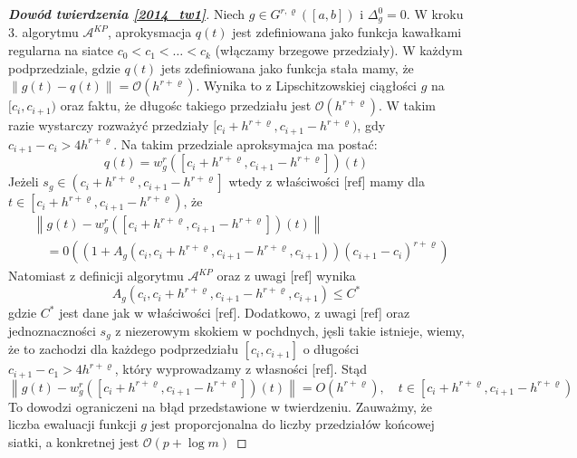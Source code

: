 \documentclass[oik, pdftex, robocza, man]{mgrwms}
\begin{document}
    \begin{proof}[\textbf{Dowód twierdzenia \eqref{2014_tw1}}]
        Niech $g \in G^{r, \varrho}([a,b])$ i $\Delta_{g}^{0} = 0$. W kroku 3. algorytmu $\mathcal{A}^{KP}$, aprokysmacja $q(t)$ jest zdefiniowana jako funkcja kawałkami regularna na siatce $c_{0} < c_{1} < \ldots < c_{k}$ (włączamy brzegowe przedziały). W każdym podprzedziale, gdzie $q(t)$ jets zdefiniowana jako funkcja stała mamy, że $\|g(t) - q(t)\| = \mathcal{O}(h^{r+\varrho})$. Wynika to z Lipschitzowskiej ciągłości $g$ na $[c_{i}, c_{i+1})$ oraz faktu, że długośc takiego przedziału jest $\mathcal{O}(h^{r+\varrho})$.
        W takim razie wystarczy rozważyć przedziały $[c_{i} + h^{r+\varrho}, c_{i+1} - h^{r+\varrho})$, gdy $c_{i+1}-c_{i} > 4h^{r+\varrho}$. Na takim przedziale aproksymajca ma postać:
        \begin{equation*}
            q(t)=w_{g}^{r}\left(\left[c_{i}+h^{r+\varrho}, c_{i+1}-h^{r+\varrho}\right]\right)(t)            
        \end{equation*}
        Jeżeli $s_{g} \in\left(c_{i}+h^{r+\varrho}, c_{i+1}-h^{r+\varrho}\right]$ wtedy z właściwości [ref] mamy dla $t \in\left[c_{i}+h^{r+\varrho}, c_{i+1}-h^{r+\varrho}\right)$, że
        \begin{equation*}
            \begin{aligned}
                &\left\|g(t)-w_{g}^{r}\left(\left[c_{i}+h^{r+\varrho}, c_{i+1}-h^{r+\varrho}\right]\right)(t)\right\| \\
                &\quad=0\left(\left(1+A_{g}\left(c_{i}, c_{i}+h^{r+\varrho}, c_{i+1}-h^{r+\varrho}, c_{i+1}\right)\right)\left(c_{i+1}-c_{i}\right)^{r+\varrho}\right)
            \end{aligned}                            
        \end{equation*}
        Natomiast z definicji algorytmu $\mathcal{A}^{KP}$ oraz z uwagi [ref] wynika
        \begin{equation*}
            A_{g}\left(c_{i}, c_{i}+h^{r+\varrho}, c_{i+1}-h^{r+\varrho}, c_{i+1}\right) \leq C^{*}
        \end{equation*}
        gdzie $C^{*}$ jest dane jak w właściwości [ref]. Dodatkowo, z uwagi [ref] oraz jednoznaczności $s_{g}$ z niezerowym skokiem w pochdnych, jęsli takie istnieje, wiemy, że to zachodzi dla każdego podprzedziału $[c_{i}, c_{i+1}]$ o długości $c_{i+1} - c_{1} > 4h^{r+\varrho}$, który wyprowadzamy z własności [ref].
        Stąd
        \begin{equation*}
            \left\|g(t)-w_{g}^{r}\left(\left[c_{i}+h^{r+\varrho}, c_{i+1}-h^{r+\varrho}\right]\right)(t)\right\|=O\left(h^{r+\varrho}\right), \quad t \in\left[c_{i}+h^{r+\varrho}, c_{i+1}-h^{r+\varrho}\right)
        \end{equation*}
        To dowodzi ograniczeni na błąd przedstawione w twierdzeniu. Zauważmy, że liczba ewaluacji funkcji $g$ jest proporcjonalna do liczby przedziałów końcowej siatki, a konkretnej jest $\mathcal{O}(p + \log m)$

    \end{proof}
\end{document}
